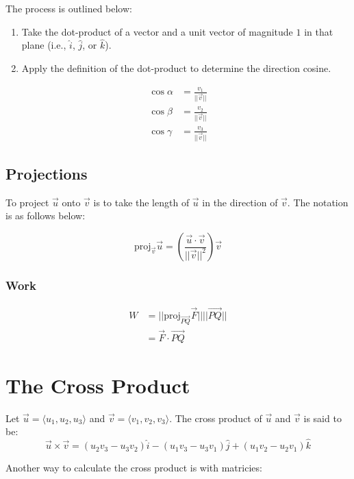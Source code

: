 The process is outlined below:
\begin{enumerate}
  \item Take the dot-product of a vector and a unit vector of magnitude $1$ in
    that plane (i.e., $\hat{i}$, $\hat{j}$, or $\hat{k}$).
  \item Apply the definition of the dot-product to determine the direction
    cosine.
\end{enumerate}

\begin{align}
  \cos\alpha &= \frac{v_1}{||\vec{v}||}\\
  \cos\beta  &= \frac{v_2}{||\vec{v}||}\\
  \cos\gamma &= \frac{v_3}{||\vec{v}||}
\end{align}

\subsection{Projections}
To project $\vec{u}$ onto $\vec{v}$ is to take the length of $\vec{u}$ in the
direction of $\vec{v}$. The notation is as follows below:

\begin{equation}
  \text{proj}_{\vec{v}}\vec{u}=
  \left(\frac{\vec{u}\cdot\vec{v}}{||\vec{v}||^2}\right)\vec{v}
\end{equation}

\subsubsection{Work}
\begin{align}
  W &= ||\text{proj}_{\vec{PQ}}\vec{F}||||\vec{PQ}|| \\
    &= \vec{F} \cdot \vec{PQ}
\end{align}

\section{The Cross Product}
Let $\vec{u}=\langle u_1,u_2,u_3 \rangle$ and $\vec{v}=\langle v_1,v_2,v_3
\rangle$. The cross product of $\vec{u}$ and $\vec{v}$ is said to be:
\begin{equation}
  \vec{u}\times\vec{v} = (u_2v_3-u_3v_2)\hat{i} - (u_1v_3-u_3v_1)\hat{j} +
  (u_1v_2-u_2v_1)\hat{k}
\end{equation}

Another way to calculate the cross product is with matricies:

